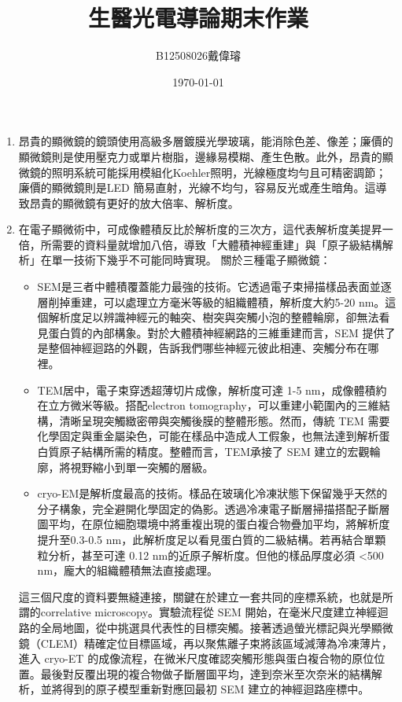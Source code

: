 \documentclass[12pt,a4paper]{article}
\title{生醫光電導論期末作業}
\author{B12508026戴偉璿}
\date{\today}
\begin{document}
\maketitle


\begin{enumerate}
  	\item 昂貴的顯微鏡的鏡頭使用高級多層鍍膜光學玻璃，能消除色差、像差；廉價的顯微鏡則是使用壓克力或單片樹脂，邊緣易模糊、產生色散。此外，昂貴的顯微鏡的照明系統可能採用模組化Koehler照明，光線極度均勻且可精密調節；廉價的顯微鏡則是LED 簡易直射，光線不均勻，容易反光或產生暗角。這導致昂貴的顯微鏡有更好的放大倍率、解析度。
  	\item 在電子顯微術中，可成像體積反比於解析度的三次方，這代表解析度美提昇一倍，所需要的資料量就增加八倍，導致「大體積神經重建」與「原子級結構解析」在單一技術下幾乎不可能同時實現。 關於三種電子顯微鏡：
  	\begin{itemize}
    	\item SEM是三者中體積覆蓋能力最強的技術。它透過電子束掃描樣品表面並逐層削掉重建，可以處理立方毫米等級的組織體積，解析度大約5-20 nm。這個解析度足以辨識神經元的軸突、樹突與突觸小泡的整體輪廓，卻無法看見蛋白質的內部構象。對於大體積神經網路的三維重建而言，SEM 提供了是整個神經迴路的外觀，告訴我們哪些神經元彼此相連、突觸分布在哪裡。
    	\item TEM居中，電子束穿透超薄切片成像，解析度可達 1-5 nm，成像體積約在立方微米等級。搭配electron tomography，可以重建小範圍內的三維結構，清晰呈現突觸緻密帶與突觸後膜的整體形態。然而，傳統 TEM 需要化學固定與重金屬染色，可能在樣品中造成人工假象，也無法達到解析蛋白質原子結構所需的精度。整體而言，TEM承接了 SEM 建立的宏觀輪廓，將視野縮小到單一突觸的層級。
    	\item cryo-EM是解析度最高的技術。樣品在玻璃化冷凍狀態下保留幾乎天然的分子構象，完全避開化學固定的偽影。透過冷凍電子斷層掃描搭配子斷層圖平均，在原位細胞環境中將重複出現的蛋白複合物疊加平均，將解析度提升至0.3-0.5 nm，此解析度足以看見蛋白質的二級結構。若再結合單顆粒分析，甚至可達 0.12  nm的近原子解析度。但他的樣品厚度必須 <500 nm，龐大的組織體積無法直接處理。
  	\end{itemize}
	這三個尺度的資料要無縫連接，關鍵在於建立一套共同的座標系統，也就是所謂的correlative microscopy。實驗流程從 SEM 開始，在毫米尺度建立神經迴路的全局地圖，從中挑選具代表性的目標突觸。接著透過螢光標記與光學顯微鏡（CLEM）精確定位目標區域，再以聚焦離子束將該區域減薄為冷凍薄片，進入 cryo-ET 的成像流程，在微米尺度確認突觸形態與蛋白複合物的原位位置。最後對反覆出現的複合物做子斷層圖平均，達到奈米至次奈米的結構解析，並將得到的原子模型重新對應回最初 SEM 建立的神經迴路座標中。


\end{enumerate}
\end{document}
